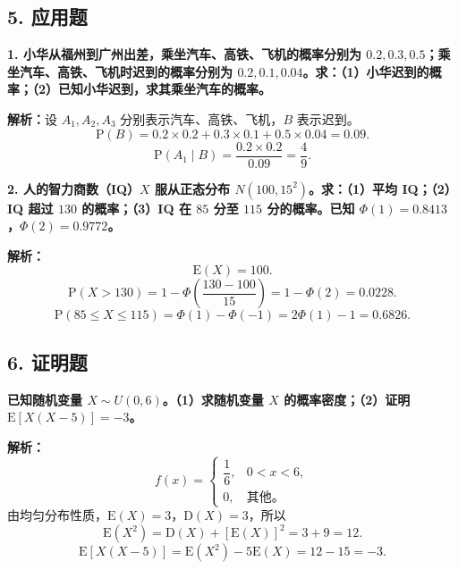 ﻿\documentclass[UTF8,11pt,a4paper]{ctexart}
\newcommand{\Pp}{\mathrm{P}}
\newcommand{\E}{\mathrm{E}}
\newcommand{\D}{\mathrm{D}}
\newcommand{\Ana}[1]{\par\textbf{解析：}#1\par\medskip}
\newcommand{\Q}[1]{\par\textbf{#1}\par}
\begin{document}
\subsection*{5. 应用题}
\Q{1. 小华从福州到广州出差，乘坐汽车、高铁、飞机的概率分别为 $0.2,0.3,0.5$；乘坐汽车、高铁、飞机时迟到的概率分别为 $0.2,0.1,0.04$。求：（1）小华迟到的概率；（2）已知小华迟到，求其乘坐汽车的概率。}
\Ana{设 $A_1,A_2,A_3$ 分别表示汽车、高铁、飞机，$B$ 表示迟到。
\[
\Pp(B)=0.2\times0.2+0.3\times0.1+0.5\times0.04=0.09.
\]
\[
\Pp(A_1\mid B)=\frac{0.2\times0.2}{0.09}=\frac49.
\]}

\Q{2. 人的智力商数（IQ）$X$ 服从正态分布 $N(100,15^2)$。求：（1）平均 IQ；（2）IQ 超过 $130$ 的概率；（3）IQ 在 $85$ 分至 $115$ 分的概率。已知 $\Phi(1)=0.8413$，$\Phi(2)=0.9772$。}
\Ana{
\[
\E(X)=100.
\]
\[
\Pp(X>130)=1-\Phi\left(\frac{130-100}{15}\right)=1-\Phi(2)=0.0228.
\]
\[
\Pp(85\le X\le115)=\Phi(1)-\Phi(-1)=2\Phi(1)-1=0.6826.
\]}

\subsection*{6. 证明题}
\Q{已知随机变量 $X\sim U(0,6)$。（1）求随机变量 $X$ 的概率密度；（2）证明 $\E[X(X-5)]=-3$。}
\Ana{
\[
f(x)=\begin{cases}\dfrac16,&0<x<6,\\0,&\text{其他}。\end{cases}
\]
由均匀分布性质，$\E(X)=3$，$\D(X)=3$，所以
\[
\E(X^2)=\D(X)+[\E(X)]^2=3+9=12.
\]
\[
\E[X(X-5)]=\E(X^2)-5\E(X)=12-15=-3.
\]}
\end{document}
